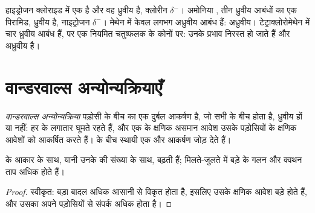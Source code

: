 \begin{example}[चार अणु]\label{ex:g11:polarity-and-cohesion:four}
हाइड्रोजन क्लोराइड  में एक  है और वह ध्रुवीय है, क्लोरीन
$\delta^-$। अमोनिया , तीन ध्रुवीय  आबंधों का एक पिरामिड,
ध्रुवीय है, नाइट्रोजन $\delta^-$। मेथेन  में केवल लगभग अध्रुवीय
 आबंध हैं: अध्रुवीय। टेट्राक्लोरोमेथेन  में चार ध्रुवीय
 आबंध हैं, पर एक नियमित चतुष्फलक के कोनों पर: उनके
प्रभाव निरस्त हो जाते हैं और  अध्रुवीय है।
\end{example}

\section{वान्डरवाल्स अन्योन्यक्रियाएँ}

\begin{definition}[वान्डरवाल्स अन्योन्यक्रिया]\label{def:g11:polarity-and-cohesion:van-der-waals}
\emph{वान्डरवाल्स अन्योन्यक्रिया}
पड़ोसी  के बीच का एक दुर्बल आकर्षण है, जो सभी  के बीच होता है,
ध्रुवीय हों या नहीं: हर  के  लगातार
घूमते रहते हैं, और एक  के क्षणिक असमान आवेश उसके पड़ोसियों के क्षणिक आवेशों
को आकर्षित करते हैं।  के बीच स्थायी  एक और आकर्षण जोड़ देते हैं।
\end{definition}


\begin{proposition}\label{prop:g11:polarity-and-cohesion:size}
  के आकार के साथ, यानी
उनके  की संख्या के साथ, बढ़ती हैं; मिलते-जुलते  में
बड़े  के गलन और क्वथन ताप अधिक होते हैं।
\end{proposition}

\begin{proof}
स्वीकृत: बड़ा  बादल अधिक आसानी से विकृत होता है, इसलिए उसके
क्षणिक आवेश बड़े होते हैं, और उसका अपने पड़ोसियों से संपर्क
अधिक होता है।
\end{proof}

